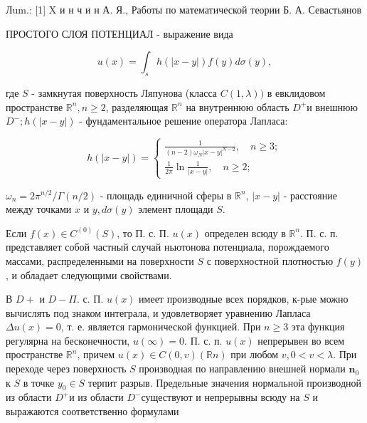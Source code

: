 \documentclass[10pt]{article}
\begin{document}
Лum.: [1] X и н ч и н А. Я., Работы по математической теории Б. А. Севастьянов



ПРОСТОГО СЛОЯ ПОТЕНЦИАЛ - выражение вида



\[

u(x)=\int_{s} h(|x-y|) f(y) d \sigma(y),

\]



где $S$ - замкнутая поверхность Ляпунова (класса $C(1, \lambda))$ в евклидовом пространстве $\mathbb{R}^{n}, n \geqslant 2$, разделяющая $\mathbb{R}^{n}$ на внутреннюю область $D^{+}$и внешнюю $D^{-} ; h(|x-y|)$ - фундаментальное решение оператора Лапласа:



\[

h(|x-y|)=\left\{\begin{array}{l}

\frac{1}{(n-2) \omega_{N}|x-y|^{N-2}}, \quad n \geqslant 3 ; \\

\frac{1}{2 \pi} \ln \frac{1}{|x-y|}, \quad n \geqslant 2 ;

\end{array}\right.

\]



$\omega_{n}=2 \pi^{n / 2} / \Gamma(n / 2)$ - площадь единичной сферы в $\mathbb{R}^{n}$, $|x-y|$ - расстояние между точками $x$ и $y, d \sigma(y)$ элемент площади $S$.



Если $f(x) \in C^{(0)}(S)$, то П. с. П. $u(x)$ определен всюду в $\mathbb{R}^{n}$. П. с. п. представляет собой частный случай ньютонова потенциала, порождаемого массами, распределенными на поверхности $S$ с поверхностной плотностью $f(y)$, и обладает следующими свойствами.



В $D+$ и $D-\Pi$. с. П. $u(x)$ имеет производные всех порядков, к-рые можно вычислять под знаком интеграла, и удовлетворяет уравнению Лапласа $\Delta u(x)=0$, т. е. является гармонической функцией. При $n \geqslant 3$ эта функция регулярна на бесконечности, $u(\infty)=0$. П. с. п. $u(x)$ непрерывен во всем пространстве $\mathbb{R}^{n}$, причем $u(x) \in C(0, v)(\mathbb{R} n)$ при любом $v, 0<v<\lambda$. При переходе через поверхность $S$ производная по направлению внешней нормали $\boldsymbol{n}_{0}$ к $S$ в точке $y_{0} \in S$ терпит разрыв. Предельные значения нормальной производной из области $D^{+}$и из области $D^{-}$существуют и непрерывны всюду на $S$ и выражаются соответственно формулами
\end{document}
